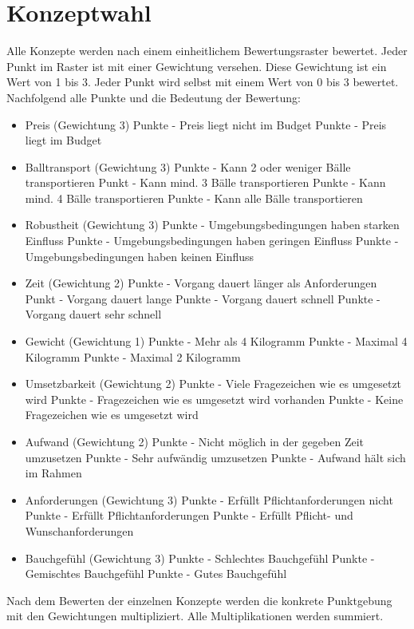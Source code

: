 \section{Konzeptwahl}
Alle Konzepte werden nach einem einheitlichem Bewertungsraster bewertet. Jeder Punkt im Raster ist mit einer Gewichtung versehen. Diese Gewichtung ist ein Wert von 1 bis 3. Jeder Punkt wird selbst mit einem Wert von 0 bis 3 bewertet. Nachfolgend alle Punkte und die Bedeutung der Bewertung:\newline
\begin{itemize}
	\item Preis (Gewichtung 3)
	 Punkte - Preis liegt nicht im Budget
	 Punkte - Preis liegt im Budget
	
	\item Balltransport (Gewichtung 3)
	 Punkte - Kann 2 oder weniger Bälle transportieren
	 Punkt - Kann mind. 3 Bälle transportieren
	 Punkte - Kann mind. 4 Bälle transportieren
	 Punkte - Kann alle Bälle transportieren
	
	\item Robustheit (Gewichtung 3)
	 Punkte - Umgebungsbedingungen haben starken Einfluss
	 Punkte - Umgebungsbedingungen haben geringen Einfluss
	 Punkte - Umgebungsbedingungen haben keinen Einfluss
	
	\item Zeit (Gewichtung 2)
	 Punkte - Vorgang dauert länger als Anforderungen
	 Punkt - Vorgang dauert lange
	 Punkte - Vorgang dauert schnell
	 Punkte - Vorgang dauert sehr schnell
	
	\item Gewicht (Gewichtung 1)
	 Punkte - Mehr als 4 Kilogramm
	 Punkte - Maximal 4 Kilogramm
	 Punkte - Maximal 2 Kilogramm
	
	\item Umsetzbarkeit (Gewichtung 2)
	 Punkte - Viele Fragezeichen wie es umgesetzt wird
	 Punkte - Fragezeichen wie es umgesetzt wird vorhanden
	 Punkte - Keine Fragezeichen wie es umgesetzt wird
	
	\item Aufwand (Gewichtung 2)
	 Punkte - Nicht möglich in der gegeben Zeit umzusetzen
	 Punkte - Sehr aufwändig umzusetzen
	 Punkte - Aufwand hält sich im Rahmen	
	
	\item Anforderungen (Gewichtung 3)
	 Punkte - Erfüllt Pflichtanforderungen nicht
	 Punkte - Erfüllt Pflichtanforderungen
	 Punkte - Erfüllt Pflicht- und Wunschanforderungen
	
	\item Bauchgefühl (Gewichtung 3)
	 Punkte - Schlechtes Bauchgefühl
	 Punkte - Gemischtes Bauchgefühl
	 Punkte - Gutes Bauchgefühl
\end{itemize}
Nach dem Bewerten der einzelnen Konzepte werden die konkrete Punktgebung mit den Gewichtungen multipliziert. Alle Multiplikationen werden summiert.

